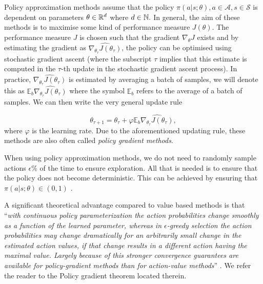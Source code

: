 Policy approximation methods assume that the policy $\pi(a|s;\theta), a \in \mathcal{A}, s \in \mathcal{S}$ is dependent on parameters $\theta \in \mathbb{R}^d$ where $d \in \mathbb{N}.$ In general, the aim of these methods is to maximise some kind of performance measure $J(\theta)$. The performance measure $J$ is chosen such that the gradient $\nabla_{\theta}J$ exists and by estimating the gradient as $\widehat{\nabla_{\theta_{\tau}} J(\theta_{\tau})}$, the policy can be optimised using stochastic gradient ascent (where the subscript $\tau$ implies that this estimate is computed in the $\tau$-th update in the stochastic gradient ascent process). In practice, $\widehat{\nabla_{\theta_{\tau}} J(\theta_{\tau})}$ is estimated by averaging a batch of samples, we will denote this as $\mathbb{E}_b \widehat{\nabla_{\theta_{\tau}} J(\theta_{\tau})}$ where the symbol $\mathbb{E}_b$ refers to the average of a batch of samples. We can then write the very general update rule

%
\begin{equation*}
\label{eq:policy_approximation_updating_rule}
\theta_{\tau+1}=\theta_{\tau}+\varphi \mathbb{E}_b\widehat{\nabla_{\theta_{\tau}} J(\theta_{\tau})},
\end{equation*}
where $\varphi$ is the learning rate.
Due to the aforementioned updating rule, these methods are also often called \textit{policy gradient methods}. 

\begin{rem} 
When using policy approximation methods, we do not need to randomly sample actions $\epsilon \%$ of the time to ensure exploration. All that is needed is to ensure that the policy does not become deterministic. This can be achieved by ensuring that $\pi(a|s;\theta) \in (0,1)$ \cite[Section 13.1]{sutton2018reinforcement}.
\end{rem}

A significant theoretical advantage compared to value based methods is that “\textit{with continuous policy parameterization the action probabilities change smoothly as a function of the learned parameter, whereas in $\epsilon$-greedy selection the action probabilities may change dramatically for an arbitrarily small change in the estimated action values, if that change results in a different action having the maximal value. Largely because of this stronger convergence guarantees are available for policy-gradient methods than for action-value methods}” \cite[Section 13.2]{sutton2018reinforcement}. We refer the reader to the Policy gradient theorem located therein.

